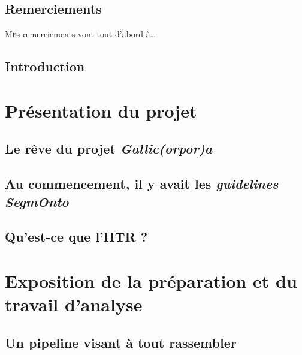 \documentclass[a4paper,12pt,twoside]{book}
\begin{document}
	
	
	\chapter{Remerciements}
	\lettrine{M}es remerciements vont tout d'abord à\dots
	
	
	\printglossaries
	
	\chapter{Introduction}
	
	
	\thispagestyle{empty}
	\cleardoublepage
	
	\mainmatter
	
	\part{Présentation du projet}
	
	\chapter{Le rêve du projet \textit{Gallic(orpor)a}}
	
	
	\chapter{Au commencement, il y avait les \textit{guidelines SegmOnto}}
	\label{chap:segmonto}
	
	
	\chapter{Qu'est-ce que l'HTR ?}
	
	\label{chap:htr}
	
	\part{Exposition de la préparation et du travail d'analyse}

	\chapter{Un pipeline visant à tout rassembler}
	
	\label{chap:pipeline}
	
\end{document}

